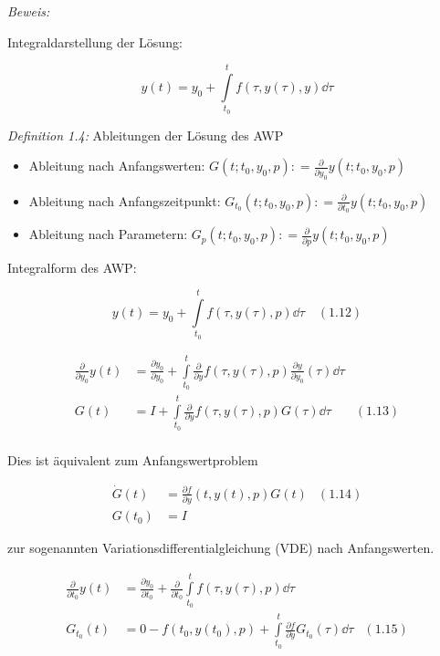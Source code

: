 \emph{Beweis:}

Integraldarstellung der Lösung:

\[ y(t) = y_0 + \int\limits_{t_0}^t f(\tau, y(\tau), y) \dd \tau \]

\emph{Definition 1.4:} Ableitungen der Lösung des AWP

\begin{itemize}
\item Ableitung nach Anfangswerten: $G(t; t_0, y_0, p) \colon= \tfrac{\partial}{\partial y_0} y(t; t_0, y_0, p)$
\item Ableitung nach Anfangszeitpunkt: $G_{t_0}(t; t_0, y_0, p) \colon= \frac{\partial}{\partial t_0} y(t; t_0, y_0, p)$
\item Ableitung nach Parametern: $G_p(t; t_0, y_0, p) \colon= \frac{\partial}{\partial p} y(t; t_0, y_0, p)$
\end{itemize}


Integralform des AWP:

\[y(t) = y_0 + \int\limits_{t_0}^t f(\tau, y(\tau), p) \dd \tau \quad (1.12) \]


\begin{align*}
\frac{\partial}{\partial y_0} y(t) &= \frac{\partial y_0}{\partial y_0} + \int\limits_{t_0}^t \frac{\partial}{\partial y} f(\tau, y(\tau), p) \frac{\partial y}{\partial y_0} (\tau) \dd \tau \\
G(t) &= I + \int\limits_{t_0}^t \frac{\partial}{\partial y} f(\tau, y(\tau), p) G(\tau) \dd \tau & (1.13)\\
\end{align*}

Dies ist äquivalent zum Anfangswertproblem

\begin{align*}
\dot G(t) &= \frac{\partial f}{\partial y} (t, y(t), p) G(t) & (1.14)\\
G(t_0) &= I
\end{align*}

zur sogenannten Variationsdifferentialgleichung (VDE) nach Anfangswerten.


\begin{align*}
\frac{\partial}{\partial t_0} y(t) &= \frac{\partial y_0}{\partial t_0} + \frac{\partial}{\partial t_0} \int\limits_{t_0}^t f(\tau, y(\tau),p) \dd \tau \\
G_{t_0} (t) &= 0 - f(t_0, y(t_0), p) + \int\limits_{t_0}^t \frac{\partial f}{\partial y} G_{t_0} (\tau) \dd \tau & (1.15) \\
\end{align*}

